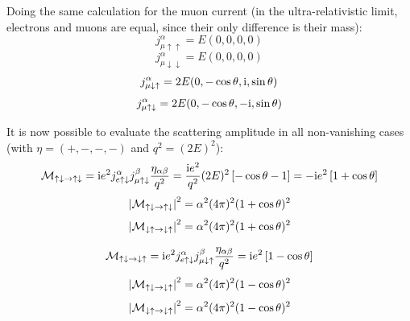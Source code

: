 Doing the same calculation for the muon current (in the ultra-relativistic limit, electrons and muons are equal, since their only difference is their mass):
\begin{equation*}
  j_{\mu \uparrow \uparrow}^\alpha = E (0,0,0,0)
\end{equation*}
\begin{equation*}
  j_{\mu \downarrow \downarrow}^\alpha = E (0,0,0,0)
\end{equation*}
\begin{equation*}
  j_{\mu \downarrow \uparrow}^\alpha = 2E (0, -\cos \theta, \mathrm{i}, \sin \theta)
\end{equation*}
\begin{equation*}
  j_{\mu \uparrow \downarrow}^\alpha = 2E (0, - \cos \theta, -\mathrm{i}, \sin \theta)
\end{equation*}

It is now possible to evaluate the scattering amplitude in all non-vanishing cases (with $ \eta = (+,-,-,-) $ and $ q^2 = (2E)^2 $):
\begin{equation*}
  \mathcal{M}_{\uparrow \downarrow \rightarrow \uparrow \downarrow} = \mathrm{i} e^2 j_{e \uparrow \downarrow}^\alpha j_{\mu \uparrow \downarrow}^\beta \frac{\eta_{\alpha \beta}}{q^2} = \frac{\mathrm{i} e^2}{q^2} (2E)^2 \left[ -\cos \theta - 1 \right] = - \mathrm{i} e^2 \left[ 1 + \cos \theta \right]
\end{equation*}
\begin{equation*}
  \left\lvert\mathcal{M}_{\uparrow \downarrow \rightarrow \uparrow \downarrow}\right\rvert^2 = \alpha^2 (4\pi)^2 (1 + \cos \theta)^2
\end{equation*}
\begin{equation*}
  \left\lvert\mathcal{M}_{\downarrow \uparrow \rightarrow \downarrow \uparrow}\right\rvert^2 = \alpha^2 (4\pi)^2 (1 + \cos \theta)^2
\end{equation*}

\begin{equation*}
  \mathcal{M}_{\uparrow \downarrow \rightarrow \downarrow \uparrow} = \mathrm{i} e^2 j_{e \uparrow \downarrow}^\alpha j_{\mu \downarrow \uparrow}^\beta \frac{\eta_{\alpha \beta}}{q^2} = \mathrm{i} e^2 \left[ 1 - \cos \theta \right]
\end{equation*}
\begin{equation*}
  \left\lvert\mathcal{M}_{\uparrow \downarrow \rightarrow \downarrow \uparrow}\right\rvert^2 = \alpha^2 (4\pi)^2 (1 - \cos \theta)^2
\end{equation*}
\begin{equation*}
  \left\lvert\mathcal{M}_{\downarrow \uparrow \rightarrow \downarrow \uparrow}\right\rvert^2 = \alpha^2 (4\pi)^2 (1 - \cos \theta)^2
\end{equation*}

